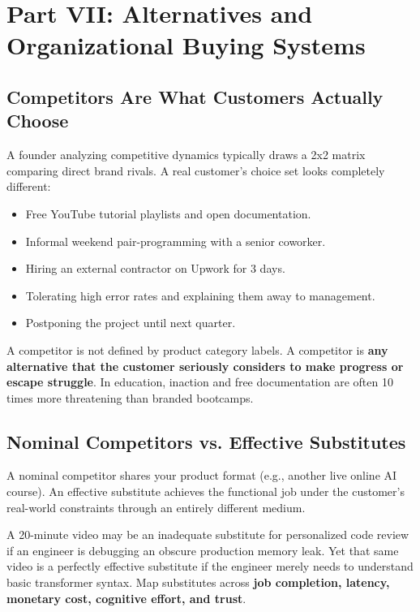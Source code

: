 \section{Part VII: Alternatives and Organizational Buying Systems}

\subsection{Competitors Are What Customers Actually Choose}

A founder analyzing competitive dynamics typically draws a 2x2 matrix comparing direct brand rivals. A real customer's choice set looks completely different:
\begin{itemize}[leftmargin=1.2em,itemsep=0.2ex]
  \item Free YouTube tutorial playlists and open documentation.
  \item Informal weekend pair-programming with a senior coworker.
  \item Hiring an external contractor on Upwork for 3 days.
  \item Tolerating high error rates and explaining them away to management.
  \item Postponing the project until next quarter.
\end{itemize}

A competitor is not defined by product category labels. A competitor is \textbf{any alternative that the customer seriously considers to make progress or escape struggle}. In education, inaction and free documentation are often 10 times more threatening than branded bootcamps.

\subsection{Nominal Competitors vs. Effective Substitutes}

A nominal competitor shares your product format (e.g., another live online AI course). An effective substitute achieves the functional job under the customer's real-world constraints through an entirely different medium.

A 20-minute video may be an inadequate substitute for personalized code review if an engineer is debugging an obscure production memory leak. Yet that same video is a perfectly effective substitute if the engineer merely needs to understand basic transformer syntax. Map substitutes across \textbf{job completion, latency, monetary cost, cognitive effort, and trust}.

